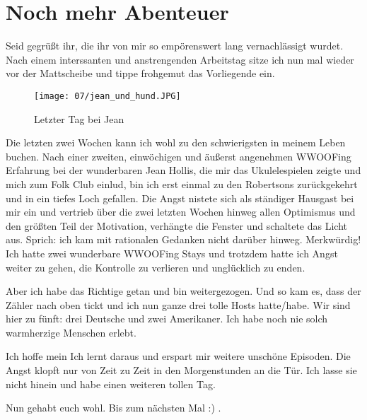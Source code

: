 \chapter{Noch mehr Abenteuer}

Seid gegrüßt ihr, die ihr von mir so empörenswert lang vernachlässigt
wurdet. Nach einem interssanten und anstrengenden Arbeitstag sitze ich
nun mal wieder vor der Mattscheibe und tippe frohgemut das Vorliegende
ein.

\begin{figure}[h]
  \centering
  \texttt{[image: 07/jean\_und\_hund.JPG]}
  \caption*{Letzter Tag bei Jean}
\end{figure}
Die letzten zwei Wochen kann ich wohl zu den schwierigsten in meinem
Leben buchen. Nach einer zweiten, einwöchigen und äußerst angenehmen
WWOOFing Erfahrung bei der wunderbaren Jean Hollis, die mir das
Ukulelespielen zeigte und mich zum Folk Club einlud, bin ich erst einmal
zu den Robertsons zurückgekehrt und in ein tiefes Loch gefallen. Die
Angst nistete sich als ständiger Hausgast bei mir ein und vertrieb über
die zwei letzten Wochen hinweg allen Optimismus und den größten Teil der
Motivation, verhängte die Fenster und schaltete das Licht aus. Sprich:
ich kam mit rationalen Gedanken nicht darüber hinweg. Merkwürdig! Ich
hatte zwei wunderbare WWOOFing Stays und trotzdem hatte ich Angst weiter
zu gehen, die Kontrolle zu verlieren und unglücklich zu enden.

Aber ich habe das Richtige getan und bin weitergezogen. Und so kam es,
dass der Zähler nach oben tickt und ich nun ganze drei tolle Hosts
hatte/habe. Wir sind hier zu fünft: drei Deutsche und zwei Amerikaner.
Ich habe noch nie solch warmherzige Menschen erlebt.

Ich hoffe mein Ich lernt daraus und erspart mir weitere unschöne
Episoden. Die Angst klopft nur von Zeit zu Zeit in den Morgenstunden an
die Tür. Ich lasse sie nicht hinein und habe einen weiteren tollen Tag.

Nun gehabt euch wohl. Bis zum nächsten Mal :) .
